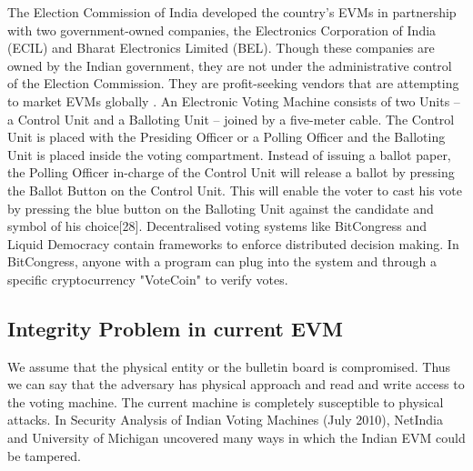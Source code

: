 \documentclass{report}
\begin{document}
The Election Commission of India developed the country’s EVMs in partnership with two government-owned companies, the Electronics Corporation of India (ECIL) and Bharat Electronics Limited (BEL). Though these companies are owned by the Indian government, they are not under the administrative control of the Election Commission. They are profit-seeking vendors that are attempting to market EVMs globally \cite{WinNT29}.  An Electronic Voting Machine consists of two Units – a Control Unit and a Balloting Unit – joined by a five-meter cable. The Control Unit is placed with the Presiding Officer or a Polling Officer and the Balloting Unit is placed inside the voting compartment. Instead of issuing a ballot paper, the Polling Officer in-charge of the Control Unit will release a ballot by pressing the Ballot Button on the Control Unit. This will enable the voter to cast his vote by pressing the blue button on the Balloting Unit against the candidate and symbol of his choice[28].  Decentralised voting systems like BitCongress and Liquid Democracy contain frameworks to enforce distributed decision making. In BitCongress, anyone with a program can plug into the system and through a specific cryptocurrency "VoteCoin" to verify votes. 
\subsection{Integrity Problem in current EVM}
We assume that the physical entity or the bulletin board is compromised. Thus we can say that the adversary has physical approach and read and write access to the voting machine. The current machine is completely susceptible to physical attacks. In Security Analysis of Indian Voting Machines \cite{wolchok2010security} (July 2010), NetIndia and University of Michigan uncovered many ways in which the Indian EVM could be tampered.\\
\end{document}

